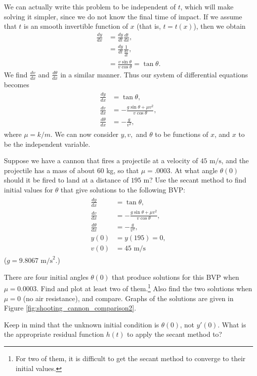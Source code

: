 We can actually write this problem to be independent of \(t\), which will make solving it simpler, since we do not know the final time of impact.
If we assume that $t$ is an smooth invertible function of $x$ (that is, $t = t(x)$), then we obtain
\begin{align*}
\frac{dy}{dx} &= \frac{dy}{dt}\frac{dt}{dx} ,\\
&= \frac{dy}{dt} \frac{1}{\frac{dx}{dt}}, \\
&= \frac{v \sin{\theta}}{v\cos{\theta}} = \tan{\theta}.
\end{align*}
We find $\frac{dv}{dx}$ and $\frac{d\theta}{dx}$ in a similar manner.
Thus our system of differential equations becomes
\begin{align}
	\begin{split}
\frac{dy}{dx} &= \tan {\theta} ,\\
\frac{dv}{dx} &= -\frac{g \sin{\theta} + \mu v^2}{v \cos{\theta}},\\
\frac{d\theta}{dx} &= -\frac{g}{v^2}, \label{eqn:cannon_DEs}
	\end{split}
\end{align}
where $\mu = k/m.$
We can now consider \(y,v,\) and \(\theta\) to be functions of \(x\), and \(x\) to be the independent variable.

\begin{problem}
Suppose we have a cannon that fires a projectile at a velocity of $45\text{ m/s}$, and the projectile has a mass of about $60$ kg, so that $\mu = .0003$.
At what angle $\theta(0)$ should it be fired to land at a distance of $195\text{ m}$?
Use the secant method to find initial values for \(\theta\) that give solutions to the following BVP:
\begin{align}
	\label{eqn:cannon_shooting}
	\begin{split}
\frac{dy}{dx} &= \tan {\theta} ,\\
\frac{dv}{dx} &= -\frac{g \sin{\theta} + \mu v^2}{v \cos{\theta}},\\
\frac{d\theta}{dx} &= -\frac{g}{v^2},\\
y(0)&= y(195) = 0,\\
v(0) &= 45 \text{ m/s}
	\end{split}
\end{align}
($g = 9.8067\text{ m/s}^2$.)

There are four initial angles $\theta(0)$ that produce solutions for this BVP when $\mu = 0.0003$.
Find and plot at least two of them.\footnote{For two of them, it is difficult to get the secant method to converge to their initial values.}
Also find the two solutions when $\mu = 0$ (no air resistance), and compare.
Graphs of the solutions are given in Figure \ref{fig:shooting_cannon_comparison2}.

Keep in mind that the unknown initial condition is $\theta(0)$, not $y'(0)$.
What is the appropriate residual function $h(t)$ to apply the secant method to?
\end{problem}

